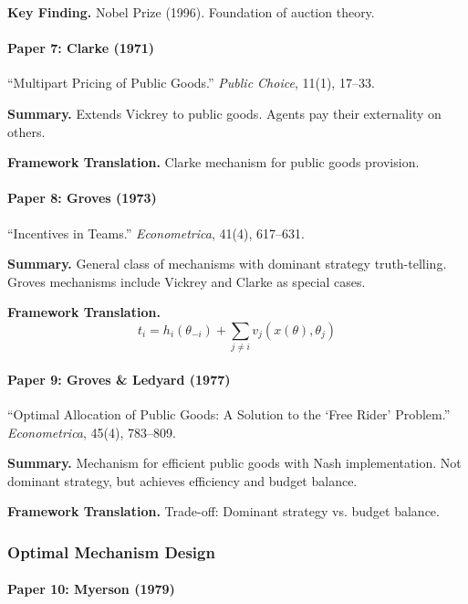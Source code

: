 \textbf{Key Finding.}
Nobel Prize (1996). Foundation of auction theory.

\paragraph{Paper 7: Clarke (1971)}

``Multipart Pricing of Public Goods.''
\textit{Public Choice}, 11(1), 17--33.

\textbf{Summary.}
Extends Vickrey to public goods. Agents pay their externality on others.

\textbf{Framework Translation.}
Clarke mechanism for public goods provision.

\paragraph{Paper 8: Groves (1973)}

``Incentives in Teams.''
\textit{Econometrica}, 41(4), 617--631.

\textbf{Summary.}
General class of mechanisms with dominant strategy truth-telling.
Groves mechanisms include Vickrey and Clarke as special cases.

\textbf{Framework Translation.}
\begin{equation}
t_i = h_i(\theta_{-i}) + \sum_{j \neq i} v_j(x(\theta), \theta_j)
\end{equation}

\paragraph{Paper 9: Groves \& Ledyard (1977)}

``Optimal Allocation of Public Goods: A Solution to the `Free Rider' Problem.''
\textit{Econometrica}, 45(4), 783--809.

\textbf{Summary.}
Mechanism for efficient public goods with Nash implementation.
Not dominant strategy, but achieves efficiency and budget balance.

\textbf{Framework Translation.}
Trade-off: Dominant strategy vs. budget balance.

\subsubsection{Optimal Mechanism Design}

\paragraph{Paper 10: Myerson (1979)}

